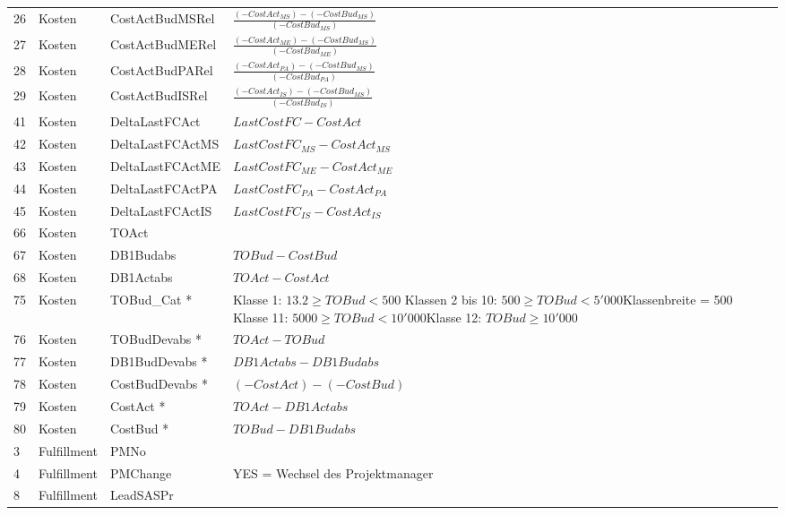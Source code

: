 \begin{longtable}{p{0.5cm}|p{4cm}|p{3.5cm}|p{6cm}}
	26    & Kosten & CostActBudMSRel & $\frac{(-CostAct_{MS}) - (-CostBud_{MS})}{(-CostBud_{MS})}$ \\ [3mm]
	27    & Kosten & CostActBudMERel & $\frac{(-CostAct_{ME}) - (-CostBud_{MS})}{(-CostBud_{ME})}$ \\ [3mm]
	28    & Kosten & CostActBudPARel & $\frac{(-CostAct_{PA}) - (-CostBud_{MS})}{(-CostBud_{PA})}$ \\ [3mm]
	29    & Kosten & CostActBudISRel & $\frac{(-CostAct_{IS}) - (-CostBud_{MS})}{(-CostBud_{IS})}$ \\ [3mm]
	41    & Kosten & DeltaLastFCAct & $Last Cost FC-Cost Act$ \\
	42    & Kosten & DeltaLastFCActMS & $Last Cost FC_{MS}-Cost Act_{MS}$ \\
	43    & Kosten & DeltaLastFCActME & $Last Cost FC_{ME}-Cost Act_{ME}$ \\
	44    & Kosten & DeltaLastFCActPA & $Last Cost FC_{PA}-Cost Act_{PA}$\\
	45    & Kosten & DeltaLastFCActIS & $Last Cost FC_{IS}-Cost Act_{IS}$\\
	66    & Kosten & TOAct &\\
	67    & Kosten & DB1Budabs & $TOBud-CostBud$\\
	68    & Kosten & DB1Actabs & $TOAct-CostAct$\\
	75    & Kosten & TOBud\_Cat * &
	\small Klasse 1: $13.2 \geq TOBud < 500$ \newline Klassen 2 bis 10: \newline $500 \geq TOBud < 5'000$\newline Klassenbreite = 500 \newline Klasse 11: $5000 \geq TOBud < 10'000$\newline Klasse 12: $ TOBud \geq 10'000$\\
	76    & Kosten & TOBudDevabs * & $TOAct-TOBud$\\
	77    & Kosten & DB1BudDevabs * & $DB1Actabs-DB1Budabs$\\
	78    & Kosten & CostBudDevabs * & $(-CostAct)-(-CostBud)$ \\
	79    & Kosten & CostAct *& $TOAct-DB1Actabs$\\
	80    & Kosten & CostBud * & $TOBud-DB1Budabs$\\\hline
	3     & Fulfillment & PMNo & \\
	4     & Fulfillment & PMChange & YES = Wechsel des Projektmanager \\
	8     & Fulfillment & LeadSASPr & \\

\end{longtable}

